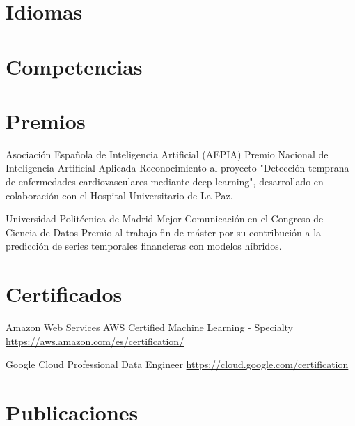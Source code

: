 \documentclass[a4paper, serif, 10pt]{moderncv}
\begin{document}
\section{Idiomas}

\section{Competencias}

\section{Premios}

        {Asociación Española de Inteligencia Artificial (AEPIA)}
        {Premio Nacional de Inteligencia Artificial Aplicada}
        {}
        {}
        {Reconocimiento al proyecto "Detección temprana de enfermedades cardiovasculares mediante deep learning", desarrollado en colaboración con el Hospital Universitario de La Paz.}

        {Universidad Politécnica de Madrid}
        {Mejor Comunicación en el Congreso de Ciencia de Datos}
        {}
        {}
        {Premio al trabajo fin de máster por su contribución a la predicción de series temporales financieras con modelos híbridos.}
\section{Certificados}

        {Amazon Web Services}
        {AWS Certified Machine Learning - Specialty}
        {\url{https://aws.amazon.com/es/certification/}}
        {}
        {}

        {Google Cloud}
        {Professional Data Engineer}
        {\url{https://cloud.google.com/certification}}
        {}
        {}
\section{Publicaciones}
\end{document}
